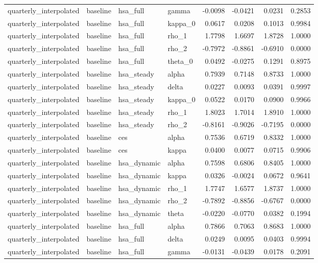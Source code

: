\begin{tabular}{llllrrrr}
quarterly\_interpolated & baseline & hsa\_full & gamma & -0.0098 & -0.0421 & 0.0231 & 0.2853 \\
quarterly\_interpolated & baseline & hsa\_full & kappa\_0 & 0.0617 & 0.0208 & 0.1013 & 0.9984 \\
quarterly\_interpolated & baseline & hsa\_full & rho\_1 & 1.7798 & 1.6697 & 1.8728 & 1.0000 \\
quarterly\_interpolated & baseline & hsa\_full & rho\_2 & -0.7972 & -0.8861 & -0.6910 & 0.0000 \\
quarterly\_interpolated & baseline & hsa\_full & theta\_0 & 0.0492 & -0.0275 & 0.1291 & 0.8975 \\
quarterly\_interpolated & baseline & hsa\_steady & alpha & 0.7939 & 0.7148 & 0.8733 & 1.0000 \\
quarterly\_interpolated & baseline & hsa\_steady & delta & 0.0227 & 0.0093 & 0.0391 & 0.9997 \\
quarterly\_interpolated & baseline & hsa\_steady & kappa\_0 & 0.0522 & 0.0170 & 0.0900 & 0.9966 \\
quarterly\_interpolated & baseline & hsa\_steady & rho\_1 & 1.8023 & 1.7014 & 1.8910 & 1.0000 \\
quarterly\_interpolated & baseline & hsa\_steady & rho\_2 & -0.8161 & -0.9026 & -0.7195 & 0.0000 \\
quarterly\_interpolated & baseline & ces & alpha & 0.7536 & 0.6719 & 0.8332 & 1.0000 \\
quarterly\_interpolated & baseline & ces & kappa & 0.0400 & 0.0077 & 0.0715 & 0.9906 \\
quarterly\_interpolated & baseline & hsa\_dynamic & alpha & 0.7598 & 0.6806 & 0.8405 & 1.0000 \\
quarterly\_interpolated & baseline & hsa\_dynamic & kappa & 0.0326 & -0.0024 & 0.0672 & 0.9641 \\
quarterly\_interpolated & baseline & hsa\_dynamic & rho\_1 & 1.7747 & 1.6577 & 1.8737 & 1.0000 \\
quarterly\_interpolated & baseline & hsa\_dynamic & rho\_2 & -0.7892 & -0.8856 & -0.6767 & 0.0000 \\
quarterly\_interpolated & baseline & hsa\_dynamic & theta & -0.0220 & -0.0770 & 0.0382 & 0.1994 \\
quarterly\_interpolated & baseline & hsa\_full & alpha & 0.7866 & 0.7063 & 0.8683 & 1.0000 \\
quarterly\_interpolated & baseline & hsa\_full & delta & 0.0249 & 0.0095 & 0.0403 & 0.9994 \\
quarterly\_interpolated & baseline & hsa\_full & gamma & -0.0131 & -0.0439 & 0.0178 & 0.2091 \\

\end{tabular}
